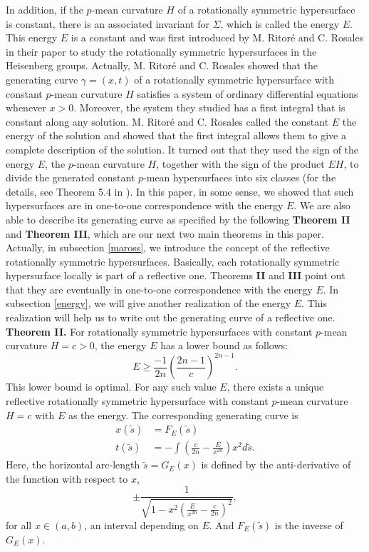 \documentclass[12pt]{amsart}
\theoremstyle{definition}\newtheorem{exa}[thm]{\sc Example}
\theoremstyle{definition}\newtheorem{de}[thm]{\sc Definition}
\theoremstyle{definition}\newtheorem{rem}[thm]{\sc Remark}
\theoremstyle{definition}\newtheorem{prob}[thm]{\it Problem}
\theoremstyle{definition}\newtheorem{fact}[thm]{\sc Fact}
\theoremstyle{definition}\newtheorem{claim}[thm]{\sc Claim}
\numberwithin{equation}{section}
\begin{document}
In addition, if the $p$-mean curvature $H$ of a rotationally symmetric hypersurface is constant, there is  an associated invariant for $\Sigma$, which is called the energy $E$. This energy $E$ is a constant and was first introduced by M. Ritor\'{e} and C. Rosales in their paper \cite{RR} to study the rotationally symmetric hypersurfaces in the Heisenberg groups. Actually, M. Ritor\'{e} and C. Rosales showed that the generating curve $\gamma=(x,t)$ of a rotationally symmetric hypersurface with constant $p$-mean curvature $H$ satisfies a system of ordinary differential equations whenever $x>0$. Moreover, the system they studied has a first integral that is constant along any solution. M. Ritor\'{e} and C. Rosales called the constant $E$ the energy of the solution and showed that the first integral allows them to give a complete description of the solution.  It turned out that they used the sign of the energy $E$, the $p$-mean curvature $H$, together with the sign of the product $EH$, to divide the generated constant $p$-mean hypersurfaces into six classes (for the details, see Theorem 5.4 in \cite{RR}). In this paper, in some sense, we showed that such hypersurfaces are in one-to-one correspondence with the energy $E$. We are also able to describe its generating curve as specified by the following {\bf Theorem II} and {\bf Theorem III}, which are our next two main theorems in this paper. Actually, in subsection \ref{maross}, we introduce the concept of the reflective rotationally symmetric hypersurfaces. Basically, each rotationally symmetric hypersurface locally is part of a reflective one. Theorems {\bf II} and {\bf III} point out that they are eventually in one-to-one correspondence with the energy $E$. In subsection \ref{energy}, we will give another realization of the energy $E$. This realization will help us to write out the generating curve of a reflective one. \\

{\bf Theorem II.}
For rotationally symmetric hypersurfaces with constant $p$-mean curvature $H=c>0$, the energy $E$ has a lower bound as follows:
\begin{equation}\label{ineqoE1}
E\geq\frac{-1}{2n}\left(\frac{2n-1}{c}\right)^{2n-1}.
\end{equation}
This lower bound is optimal. For any such value $E$, there exists a unique reflective rotationally symmetric hypersurface with constant $p$-mean curvature $H=c$ with $E$ as the energy. The corresponding generating curve is
\begin{equation}
\begin{split}
x(\tilde{s})&=F_{E}(\tilde{s})\\
t(\tilde{s})&=-\int \left(\frac{c}{2n}-\frac{E}{x^{2n}}\right) x^{2}d\tilde{s}.
\end{split}
\end{equation}
Here, the horizontal arc-length $\tilde{s}=G_{E}(x)$ is defined by the anti-derivative of the function with respect to $x$,
\[\pm \frac{1}{\sqrt{1-x^{2}\left(\frac{E}{x^{2n}}-\frac{c}{2n}\right)^{2}}} ,\]
for all $x\in(a,b)$, an interval depending on $E$. And $F_{E}(\tilde{s})$ is the inverse of $G_{E}(x)$. \\
\end{document}
